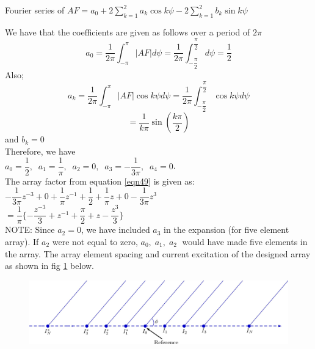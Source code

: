 \begin{exmp}
Fourier series of $AF =
a_0 + 2 \sum_{k = 1}^{2}a_k\cos k\psi - 2 \sum_{k = 1}^{2}b_k\sin k\psi
\label{sum}
$

We have that the coefficients are given as follows over a period of $2\pi$
$$a_0 = \dfrac{1}{2\pi}\int_{-\pi}^{\pi}|AF|d\psi = \dfrac{1}{2\pi}\int_{-\dfrac{\pi}{2}}^{\dfrac{\pi}{2}}d\psi = \frac{1}{2}$$
Also;
$$a_k = \dfrac{1}{2\pi}\int_{-\pi}^{\pi}|AF|\cos k\psi d\psi = \dfrac{1}{2\pi}\int_{-\dfrac{\pi}{2}}^{\dfrac{\pi}{2}}\cos k\psi d\psi$$
$$= \dfrac{1}{k\pi}\sin(\dfrac{k\pi}{2})$$ and $b_k = 0$\\
Therefore, we have\\
$ a_0 = \dfrac{1}{2}, \; \; a_1 = \dfrac{1}{\pi},\; \; a_2 = 0, \; \; a_3 = -\dfrac{1}{3\pi}, \; \;a_4 = 0$.\\
The array factor from equation \ref{eqn49} is given as:\\
$-\dfrac{1}{3\pi}z^{-3} + 0 +\dfrac{1}{\pi}z^{-1} + \dfrac{1}{2} + \dfrac{1}{\pi}z + 0 - \dfrac{1}{3\pi}z^{3}$\\
$= \dfrac{1}{\pi}\{
-\dfrac{z^{-3}}{3} + z^{-1} + \dfrac{\pi}{2} + z - \dfrac{z^3}{3}
\}$\\
NOTE: Since $a_2 = 0$, we have included $a_3$ in the expansion (for five element array). If $a_2$ were not equal to zero, $a_0, \; a_1, \; a_2 \;$ would have made five elements in the array. The array element spacing and current excitation of the designed array as shown in fig \ref{fig:fig-7} below.
\begin{figure}[h]
\centering
\includegraphics[width=1\linewidth]{"./graphics/img59_8"}
\caption{}
\label{fig:fig-7}
\end{figure}

\end{exmp}
